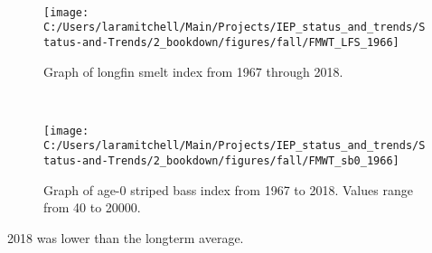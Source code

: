 \documentclass[
]{book}
\begin{document}
\begin{panel-grid}
\begin{columns-nocenter}
\begin{column800}
\begin{expand}
\end{expand}

\end{column800}

\begin{column40}

~

\end{column40}

\begin{column800}

\begin{expand}

\begin{figure}
\texttt{[image: C:/Users/laramitchell/Main/Projects/IEP\_status\_and\_trends/Status-and-Trends/2\_bookdown/figures/fall/FMWT\_LFS\_1966]} \caption{Graph of longfin smelt index from 1967 through 2018.}\label{fig:unnamed-chunk-125}
\end{figure}

\end{expand}

\end{column800}

\begin{column40}

~

\end{column40}

\begin{column800}

\begin{expand}

\begin{figure}
\texttt{[image: C:/Users/laramitchell/Main/Projects/IEP\_status\_and\_trends/Status-and-Trends/2\_bookdown/figures/fall/FMWT\_sb0\_1966]} \caption{Graph of age-0 striped bass index from 1967 to 2018. Values range from 40 to 20000.}\label{fig:unnamed-chunk-126}
\end{figure}

\end{expand}

\end{column800}

\end{columns-nocenter}

\begin{columns-nocenter}

\begin{column800}

2018 was lower than the longterm average.


\end{column800}
\end{columns-nocenter}
\end{panel-grid}
\end{document}
